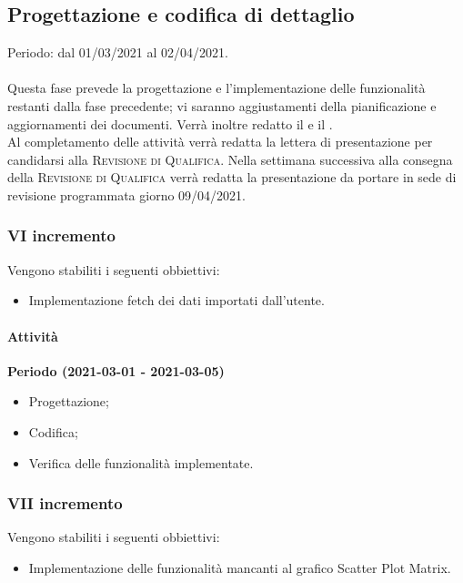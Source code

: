\documentclass[../piano_di_progetto.tex]{subfiles}
\begin{document}
\subsection{Progettazione e codifica di dettaglio}%
\label{sub:prog_dett}
Periodo: dal 01/03/2021 al 02/04/2021.\\ \\
Questa fase prevede la progettazione e l'implementazione delle funzionalità restanti dalla fase precedente; vi saranno aggiustamenti della pianificazione e aggiornamenti dei documenti. Verrà inoltre redatto il \textsc{} e il \textsc{}. \\ %
Al completamento delle attività verrà redatta la lettera di presentazione per candidarsi alla \textsc{Revisione di Qualifica}. 
Nella settimana successiva alla consegna della \textsc{Revisione di Qualifica} verrà redatta la presentazione da portare in sede di revisione programmata giorno 09/04/2021. 

\subsubsection{VI incremento}
Vengono stabiliti i seguenti obbiettivi:
\begin{itemize}
    \item Implementazione fetch dei dati importati dall'utente.
\end{itemize}
\paragraph{Attività}
\noindent\textbf{Periodo (2021-03-01 - 2021-03-05)}
\begin{itemize}
    \item Progettazione;
    \item Codifica;
    \item Verifica delle funzionalità implementate.
\end{itemize}


\subsubsection{VII incremento}
Vengono stabiliti i seguenti obbiettivi:
\begin{itemize}
    \item Implementazione delle funzionalità mancanti al grafico Scatter Plot Matrix.
\end{itemize}
\end{document}

